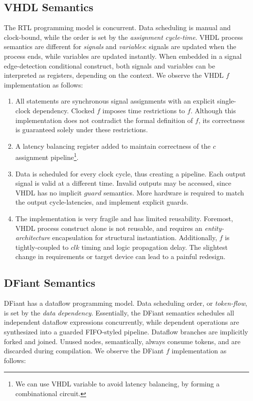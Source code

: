 \subsection{VHDL Semantics}
The RTL programming model is concurrent. Data scheduling is manual and clock-bound, while the order is set by the \textit{assignment cycle-time}. VHDL process semantics are different for \textit{signals} and \textit{variables}: signals are updated when the process ends, while variables are updated instantly. When embedded in a signal edge-detection conditional construct, both signals and variables can be interpreted as registers, depending on the context. We observe the VHDL $f$ implementation as follows:

\begin{enumerate}
	\item All statements are synchronous signal assignments with an explicit single-clock dependency. Clocked $f$ imposes time restrictions to $f$. Although this implementation does not contradict the formal definition of $f$, its correctness is guaranteed solely under these restrictions.
	\item A latency balancing register added to maintain correctness of the $c$ assignment pipeline\footnote{We can use VHDL variable to avoid latency balancing, by forming a combinational circuit.}. 
	\item Data is scheduled for every clock cycle, thus creating a pipeline. Each output signal is valid at a different time. Invalid outputs may be accessed, since VHDL has no implicit $guard$ semantics. More hardware is required to match the output cycle-latencies, and implement explicit guards.
	\item The implementation is very fragile and has limited reusability. Foremost, VHDL process construct alone is not reusable, and requires an \textit{entity-architecture} encapsulation for structural instantiation. Additionally, $f$ is tightly-coupled to $clk$ timing and logic propagation delay. The slightest change in requirements or target device can lead to a painful redesign. 
\end{enumerate}

\subsection{DFiant Semantics}
DFiant has a dataflow programming model. Data scheduling order, or \textit{token-flow}, is set by the \textit{data dependency}. Essentially, the DFiant semantics schedules all independent dataflow expressions concurrently, while dependent operations are synthesized into a guarded FIFO-styled pipeline. Dataflow branches are implicitly forked and joined. Unused nodes, semantically, always consume tokens, and are discarded during compilation. We observe the DFiant $f$ implementation as follows:

